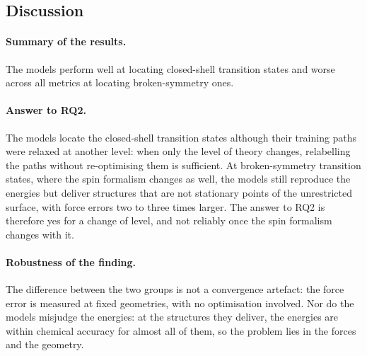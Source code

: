 \subsection{Discussion}
\label{sec:omol-discussion}

\paragraph{Summary of the results.} The models perform well at locating
closed-shell transition states and worse across all metrics at locating
broken-symmetry ones.

\paragraph{Answer to RQ2.} The models locate the closed-shell
transition states although their training paths were relaxed at another
level: when only the level of theory changes, relabelling the paths
without re-optimising them is sufficient. At broken-symmetry
transition states, where the spin formalism changes as well, the models
still reproduce the energies but deliver structures that are not
stationary points of the unrestricted surface, with force errors two to
three times larger. The answer to RQ2 is therefore yes for a change of
level, and not reliably once the spin formalism changes with it.

\paragraph{Robustness of the finding.} The difference between the two
groups is not a convergence artefact: the force error is measured at
fixed geometries, with no optimisation involved. Nor do the models
misjudge the energies: at the structures they deliver, the energies are
within chemical accuracy for almost all of them, so the problem lies in
the forces and the geometry.

